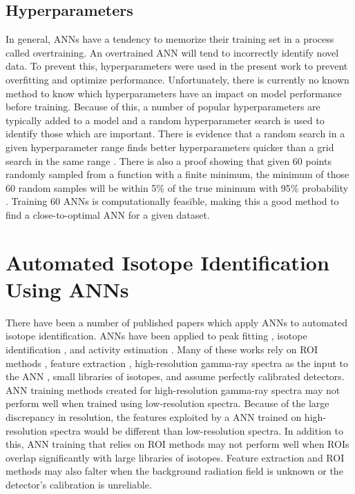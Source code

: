 \documentclass[tocnosub,noragright,centerchapter,12pt,fullpage]{uiucecethesis09}
\begin{document}
\subsection{Hyperparameters}

In general, ANNs have a tendency to memorize their training set in a process called overtraining. An overtrained ANN will tend to incorrectly identify novel data. To prevent this, hyperparameters were used in the present work to prevent overfitting and optimize performance. Unfortunately, there is currently no known method to know which hyperparameters have an impact on model performance before training. Because of this, a number of popular hyperparameters are typically added to a model and a random hyperparameter search is used to identify those which are important. There is evidence that a random search in a given hyperparameter range finds better hyperparameters quicker than a grid search in the same range \cite{Bergstra2012}. There is also a proof showing that given 60 points randomly sampled from a function with a finite minimum, the minimum of those 60 random samples will be within 5\% of the true minimum with 95\% probability \cite{Zheng2015}. Training 60 ANNs is computationally feasible, making this a good method to find a close-to-optimal ANN for a given dataset. 

\section{Automated Isotope Identification Using ANNs}

There have been a number of published papers which apply ANNs to automated isotope identification. ANNs have been applied to peak fitting \cite{Abdel-Aal2002}, isotope identification \cite{Abdel-Aal1996, Medhat2012}, and activity estimation \cite{Abdel-Aal1996, Vigneron1996}. Many of these works rely on ROI methods \cite{Pilato1999}, feature extraction \cite{Chen2009}, high-resolution gamma-ray spectra as the input to the ANN \cite{Yoshida2002}, small libraries of isotopes, and assume perfectly calibrated detectors. ANN training methods created for high-resolution gamma-ray spectra may not perform well when trained using low-resolution spectra. Because of the large discrepancy in resolution, the features exploited by a ANN trained on high-resolution spectra would be different than low-resolution spectra. In addition to this, ANN training that relies on ROI methods may not perform well when ROIs overlap significantly with large libraries of isotopes. Feature extraction and ROI methods may also falter when the background radiation field is unknown or the detector's calibration is unreliable.  
\end{document}
